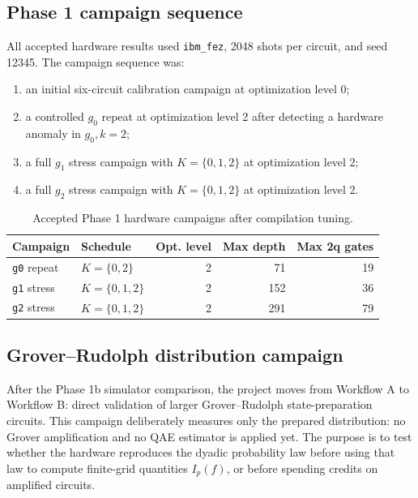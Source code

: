 \subsection{Phase 1 campaign sequence}

All accepted hardware results used \texttt{ibm\_fez}, 2048 shots per circuit,
and seed 12345. The campaign sequence was:
\begin{enumerate}[leftmargin=*]
  \item an initial six-circuit calibration campaign at optimization level 0;
  \item a controlled \(g_0\) repeat at optimization level 2 after detecting a
        hardware anomaly in \(g_0,k=2\);
  \item a full \(g_1\) stress campaign with \(K=\{0,1,2\}\) at optimization
        level 2;
  \item a full \(g_2\) stress campaign with \(K=\{0,1,2\}\) at optimization
        level 2.
\end{enumerate}

\begin{table}[h]
\centering
\begin{tabular}{llrrr}
\toprule
Campaign & Schedule & Opt. level & Max depth & Max 2q gates \\
\midrule
\texttt{g0} repeat & \(K=\{0,2\}\) & 2 & 71 & 19 \\
\texttt{g1} stress & \(K=\{0,1,2\}\) & 2 & 152 & 36 \\
\texttt{g2} stress & \(K=\{0,1,2\}\) & 2 & 291 & 79 \\
\bottomrule
\end{tabular}
\caption{Accepted Phase 1 hardware campaigns after compilation tuning.}
\label{tab:accepted-campaigns}
\end{table}

\subsection{Grover--Rudolph distribution campaign}

After the Phase 1b simulator comparison, the project moves from Workflow A to
Workflow B: direct validation of larger Grover--Rudolph state-preparation
circuits. This campaign deliberately measures only the prepared distribution:
no Grover amplification and no QAE estimator is applied yet. The purpose is to
test whether the hardware reproduces the dyadic probability law before using
that law to compute finite-grid quantities \(I_p(f)\), or before spending
credits on amplified circuits.

